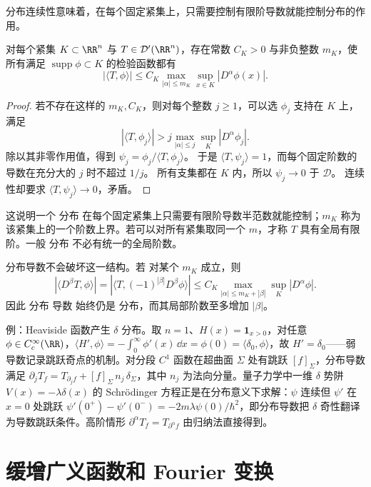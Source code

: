 分布连续性意味着，在每个固定紧集上，只需要控制有限阶导数就能控制分布的作用。

\begin{proposition}[分布在固定紧集上的有限阶估计]
对每个紧集 $K\subset\RR^n$ 与 $T\in\mathcal D'(\RR^n)$，存在常数 $C_K>0$ 与非负整数 $m_K$，使所有满足 $\operatorname{supp}\phi\subset K$ 的检验函数都有
\begin{equation}
|\langle T,\phi\rangle|
\le
C_K
\max_{|\alpha|\le m_K}
\sup_{x\in K}|D^\alpha\phi(x)|.
\label{eq:distribution-local-order-bound}
\end{equation}
\end{proposition}
\begin{proof}
若不存在这样的 $m_K,C_K$，则对每个整数 $j\ge1$，可以选 $\phi_j$ 支持在 $K$ 上，满足
\[
|\langle T,\phi_j\rangle|>j\max_{|\alpha|\le j}\sup_K|D^\alpha\phi_j|.
\]
除以其非零作用值，得到 $\psi_j=\phi_j/\langle T,\phi_j\rangle$。
于是 $\langle T,\psi_j\rangle=1$，而每个固定阶数的导数在充分大的 $j$ 时不超过 $1/j$。
所有支集都在 $K$ 内，所以 $\psi_j\to0$ 于 $\mathcal D$。
连续性却要求 $\langle T,\psi_j\rangle\to0$，矛盾。
\end{proof}
这说明一个 分布 在每个固定紧集上只需要有限阶导数半范数就能控制；$m_K$ 称为该紧集上的一个阶数上界。若可以对所有紧集取同一个 $m$，才称 $T$ 具有全局有限阶。一般 分布 不必有统一的全局阶数。

分布导数不会破坏这一结构。若 对某个 $m_K$ 成立，则
\[
|\langle D^\beta T,\phi\rangle|
=
|\langle T,(-1)^{|\beta|}D^\beta\phi\rangle|
\le
C_K
\max_{|\alpha|\le m_K+|\beta|}
\sup_K|D^\alpha\phi|.
\]
因此 分布 导数 始终仍是 分布，而其局部阶数至多增加 $|\beta|$。

例：Heaviside 函数产生 $\delta$ 分布。取 $n=1$、$H(x)=\mathbf 1_{x>0}$，对任意 $\phi\in C_c^\infty(\RR)$，$\langle H',\phi\rangle=-\int_0^\infty\phi'(x)\,\dd x=\phi(0)=\langle\delta_0,\phi\rangle$，故 $H'=\delta_0$——弱导数记录跳跃奇点的机制。对分段 $C^1$ 函数在超曲面 $\Sigma$ 处有跳跃 $[f]_\Sigma$，分布导数满足 $\partial_jT_f=T_{\partial_jf}+[f]_\Sigma\,n_j\,\delta_\Sigma$，其中 $n_j$ 为法向分量。量子力学中一维 $\delta$ 势阱 $V(x)=-\lambda\delta(x)$ 的 Schrödinger 方程正是在分布意义下求解：$\psi$ 连续但 $\psi'$ 在 $x=0$ 处跳跃 $\psi'(0^+)-\psi'(0^-)=-2m\lambda\psi(0)/\hbar^2$，即分布导数把 $\delta$ 奇性翻译为导数跳跃条件。高阶情形 $\partial^\alpha T_f=T_{\partial^\alpha f}$ 由归纳法直接得到。

\section{缓增广义函数和 Fourier 变换}
\label{sec:tempered-fourier}

